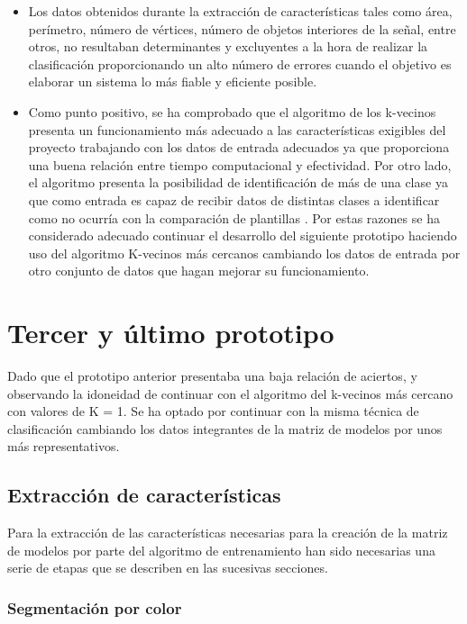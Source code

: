 \begin{itemize}

\item Los datos obtenidos durante la extracción de características tales como área, perímetro, número de vértices, número de objetos interiores de la señal, entre otros, no resultaban determinantes y excluyentes a la hora de realizar la clasificación proporcionando un alto número de errores cuando el objetivo es elaborar un sistema lo más fiable y eficiente posible.

\item Como punto positivo, se ha comprobado que el algoritmo de los k-vecinos presenta un funcionamiento más adecuado a las características exigibles del proyecto trabajando con los datos de entrada adecuados ya que proporciona una buena relación entre tiempo computacional y efectividad. Por otro lado, el algoritmo presenta la posibilidad de identificación de más de una clase ya que como entrada es capaz de recibir datos de distintas clases a identificar como no ocurría con la comparación de plantillas . Por estas razones se ha considerado adecuado continuar el desarrollo del siguiente prototipo haciendo uso del algoritmo K-vecinos más cercanos cambiando los datos de entrada por otro conjunto de datos que hagan mejorar su funcionamiento.

\end{itemize}

\section{Tercer y último prototipo}

Dado que el prototipo anterior presentaba una baja relación de aciertos, y observando la idoneidad de continuar con el algoritmo del k-vecinos más cercano con valores de K = 1. Se ha optado por continuar con la misma técnica de clasificación cambiando los datos integrantes de la matriz de modelos por unos más representativos.

\subsection{Extracción de características}

Para la extracción de las características necesarias para la creación de la matriz de modelos por parte del algoritmo de entrenamiento han sido necesarias una serie de etapas que se describen en las sucesivas secciones.

\subsubsection{Segmentación por color}

